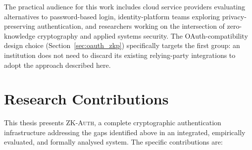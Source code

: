 \documentclass[12pt,a4paper,oneside]{report}
\begin{document}
The practical audience for this work includes cloud service providers
evaluating alternatives to password-based login, identity-platform
teams exploring privacy-preserving authentication, and researchers
working on the intersection of zero-knowledge cryptography and applied
systems security. The OAuth-compatibility design choice
(Section~\ref{sec:oauth_zkp}) specifically targets the first group:
an institution does not need to discard its existing relying-party
integrations to adopt the approach described here.

\section{Research Contributions}
\label{sec:thesis_contributions}

This thesis presents \textsc{ZK-Auth}, a complete cryptographic
authentication infrastructure addressing the gaps identified above in an
integrated, empirically evaluated, and formally analysed system. The
specific contributions are:
\end{document}
